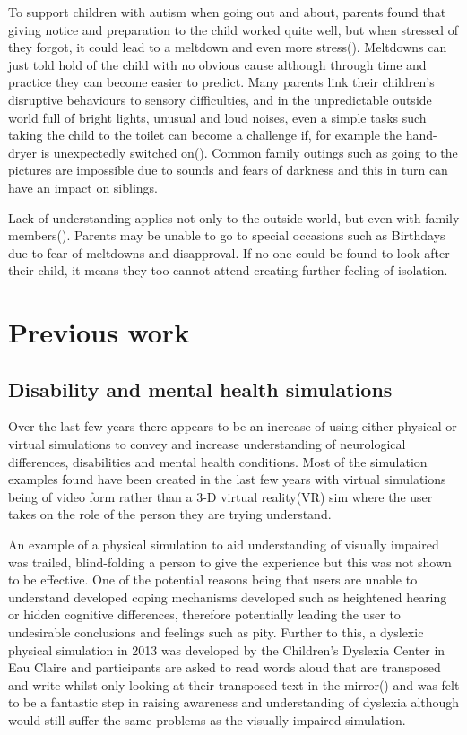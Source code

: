 \documentclass[11pt]{report}
\begin{document}
To support children with autism when going out and about, parents found that giving notice and preparation to the child worked quite well, but when stressed of they forgot, it could lead to a meltdown and even more stress(\cite{meltdowns_goingout}). Meltdowns can just told hold of the child with no obvious cause although through time and practice they can become easier to predict. Many parents link their children's disruptive behaviours to sensory difficulties, and in the unpredictable outside world full of bright lights, unusual and loud noises, even a simple tasks such taking the child to the toilet can become a challenge if, for example the hand-dryer is unexpectedly switched on(\cite{meltdowns_goingout}). Common family outings such as going to the pictures are impossible due to sounds and fears of darkness and this in turn can have an impact on siblings.  

Lack of understanding applies not only to the outside world, but even with family members(\cite{meltdowns_goingout}). Parents may be unable to go to special occasions such as Birthdays due to fear of meltdowns and disapproval. If no-one could be found to look after their child, it means they too cannot attend creating further feeling of isolation.

\section{Previous work}

\subsection{Disability and mental health simulations}
Over the last few years there appears to be an increase of using either physical or virtual simulations to convey and increase understanding of neurological differences, disabilities and mental health conditions. Most of the simulation examples found have been created in the last few years with virtual simulations being of video form rather than a 3-D virtual reality(VR) sim where the user takes on the role of the person they are trying understand.  

An example of a physical simulation to aid understanding of visually impaired was trailed, blind-folding a person to give the experience but this was not shown to be effective\cite{dd}. One of the potential reasons being that users are unable to understand developed coping mechanisms developed such as heightened hearing or hidden cognitive differences, therefore potentially leading the user to undesirable conclusions and feelings such as pity. Further to this, a dyslexic physical simulation in 2013 was developed by the Children's Dyslexia Center in Eau Claire and participants are asked to read words aloud that are transposed and write whilst only looking at their transposed text in the mirror(\cite{udyslexia}) and was felt to be a fantastic step in raising awareness and understanding of dyslexia although would still suffer the same problems as the visually impaired simulation. 
\end{document}
